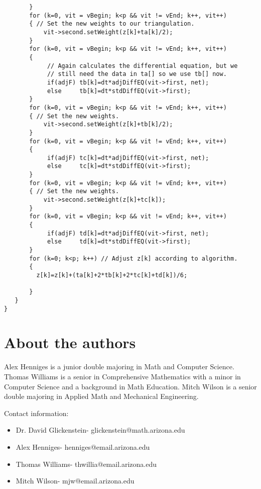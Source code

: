 \documentclass[12pt]{article}
\begin{document}
\begin{verbatim}
       }
       for (k=0, vit = vBegin; k<p && vit != vEnd; k++, vit++)  
       { // Set the new weights to our triangulation.
           vit->second.setWeight(z[k]+ta[k]/2);
       }
       for (k=0, vit = vBegin; k<p && vit != vEnd; k++, vit++)  
       {
            // Again calculates the differential equation, but we
            // still need the data in ta[] so we use tb[] now.
            if(adjF) tb[k]=dt*adjDiffEQ(vit->first, net);
            else     tb[k]=dt*stdDiffEQ(vit->first);
       }
       for (k=0, vit = vBegin; k<p && vit != vEnd; k++, vit++)  
       { // Set the new weights.
           vit->second.setWeight(z[k]+tb[k]/2);
       }
       for (k=0, vit = vBegin; k<p && vit != vEnd; k++, vit++)  
       {
            if(adjF) tc[k]=dt*adjDiffEQ(vit->first, net);
            else     tc[k]=dt*stdDiffEQ(vit->first);
       }
       for (k=0, vit = vBegin; k<p && vit != vEnd; k++, vit++)  
       { // Set the new weights.
           vit->second.setWeight(z[k]+tc[k]);
       }
       for (k=0, vit = vBegin; k<p && vit != vEnd; k++, vit++)  
       {
            if(adjF) td[k]=dt*adjDiffEQ(vit->first, net);
            else     td[k]=dt*stdDiffEQ(vit->first);
       }
       for (k=0; k<p; k++) // Adjust z[k] according to algorithm.
       {
         z[k]=z[k]+(ta[k]+2*tb[k]+2*tc[k]+td[k])/6;
         
       }
   }
}
\end{verbatim}

\section*{About the authors}

Alex Henniges is a junior double majoring in Math and Computer Science. Thomas Williams is a senior in Comprehensive Mathematics with a minor in Computer Science and a background in Math Education. Mitch Wilson is a senior double majoring in Applied Math and Mechanical Engineering.

 Contact information:
\begin{itemize}
\item Dr. David Glickenstein- glickenstein@math.arizona.edu
\item Alex Henniges- henniges@email.arizona.edu
\item Thomas Williams- thwillia@email.arizona.edu
\item Mitch Wilson- mjw@email.arizona.edu
\end{itemize}
\end{document}
